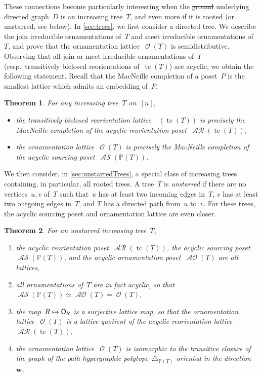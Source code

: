 \documentclass{amsart}
\newtheorem{theorem}{Theorem}[section]
\theoremstyle{definition}
\renewcommand{\b}[1]{\boldsymbol{#1}} %
\renewcommand{\c}[1]{\mathcal{#1}} %
\newcommand{\simplex}{\triangle} %
\DeclareMathOperator{\tc}{tc} %
\newcommand{\darkblue}{\color{darkblue}} %
\newcommand{\defn}[1]{\textsl{\darkblue #1}} %
\newcommand{\jose}[1]{{\color{red}#1}}
\newcommand{\mymap}[2]{\mathsf{#1}_{\hspace{-.7pt}#2}}
\DeclareMathOperator{\Orn}{\c{O}}  %
\newcommand{\orn}[1]{\mymap{O}{#1}}  %
\DeclareMathOperator{\AOrn}{\c{AO}}  %
\DeclareMathOperator{\AReori}{\c{AR}}  %
\DeclareMathOperator{\Rbi}{\c{R}^{bi}}  %
\DeclareMathOperator{\ASour}{\mathcal{AS}}  %
\newcommand{\PP}{\mathbb P} %
\begin{document}
These connections become particularly interesting when the \jose{\sout{ground} underlying} directed graph~$D$ is an increasing tree~$T$, and even more if it is rooted (or unstarred, see below).
In \cref{sec:trees}, we first consider a directed tree.
We describe the join irreducible ornamentations of~$T$ and meet irreducible ornamentations of~$T$, and prove that the ornamentation lattice~$\Orn(T)$ is semidistributive.
Observing that all join or meet irreducible ornamentations of~$T$ (resp.~transitively biclosed reorientations of~$\tc(T)$) are acyclic, we obtain the following statement.
Recall that the MacNeille completion of a poset~$P$ is the smallest lattice which admits an embedding of~$P$.

\begin{theorem}
\label{thm:main1}
For any increasing tree~$T$ on~$[n]$, 
\begin{itemize}
\item the transitively biclosed reorientation lattice~$\Rbi(\tc(T))$ is precisely the MacNeille completion of the acyclic reorientation poset~$\AReori(\tc(T))$,
\item the ornamentation lattice~$\Orn(T)$ is precisely the MacNeille completion of the acyclic sourcing poset~$\ASour(\PP(T))$.
\end{itemize}
\end{theorem}

We then consider, in \cref{sec:unstarredTrees}, a special class of increasing trees containing, in particular, all rooted trees.
A tree~$T$ is \defn{unstarred} if there are no vertices~$u,v$ of~$T$ such that~$u$ has at least two incoming edges in~$T$, $v$ has at least two outgoing edges in~$T$, and $T$ has a directed path from~$u$ to~$v$.
For these trees, the acyclic sourcing poset and ornamentation lattice are even closer.

\begin{theorem}
\label{thm:main2}
For an unstarred increasing tree~$T$,
\begin{enumerate}
\item the acyclic reorientation poset~$\AReori(\tc(T))$, the acyclic sourcing poset~$\ASour(\PP(T))$, and the acyclic ornamentation poset~$\AOrn(T)$ are all lattices,
\item all ornamentations of~$T$ are in fact acyclic, so that~$\ASour(\PP(T)) \simeq \AOrn(T) = \Orn(T)$,
\item the map~$R \mapsto \orn{R}$ is a surjective lattice map, so that the ornamentation lattice~$\Orn(T)$ is a lattice quotient of the acyclic reorientation lattice~$\AReori(\tc(T))$,
\item the ornamentation lattice~$\Orn(T)$ is isomorphic to the transitive closure of the graph of the path hypergraphic polytope~$\simplex_{\PP(T)}$ oriented in the direction~$\b{w}$. \label{item:polytopalRealization}
\end{enumerate}
\end{theorem}
\end{document}
